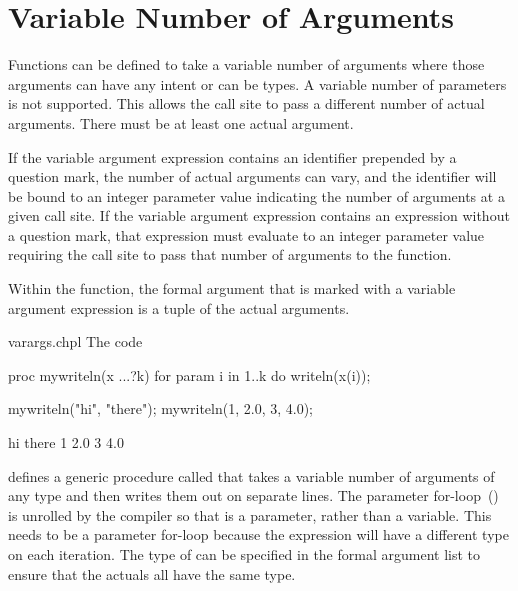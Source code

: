 \section{Variable Number of Arguments}
\label{Variable_Length_Argument_Lists}

Functions can be defined to take a variable number of arguments where
those arguments can have any intent or can be types.  A variable
number of parameters is not supported.  This allows the call site to
pass a different number of actual arguments.  There must be at least
one actual argument.

If the variable argument expression contains an identifier prepended by a
question mark, the number of actual arguments can vary, and the identifier
will be bound to an integer parameter value indicating the number of
arguments at a given call site.
If the variable argument expression contains an expression without
a question mark, that expression must evaluate to an integer parameter value
requiring the call site to pass that number of arguments to the
function.

Within the function, the formal argument that is marked with a
variable argument expression is a tuple of the actual
arguments.

\begin{chapelexample}{varargs.chpl}
The code
\begin{chapel}
proc mywriteln(x ...?k) {
  for param i in 1..k do
    writeln(x(i));
}
\end{chapel}
\begin{chapelpost}
mywriteln("hi", "there");
mywriteln(1, 2.0, 3, 4.0);
\end{chapelpost}
\begin{chapeloutput}
hi
there
1
2.0
3
4.0
\end{chapeloutput}
defines a generic procedure called  that takes a
variable number of arguments of any type and then writes them out on
separate lines.  The parameter for-loop~()
is unrolled by the compiler so that  is a parameter, rather
than a variable.  This needs to be a parameter for-loop because the
expression  will have a different type on each iteration.
The type of  can be specified in the formal argument list to
ensure that the actuals all have the same type.
\end{chapelexample}

